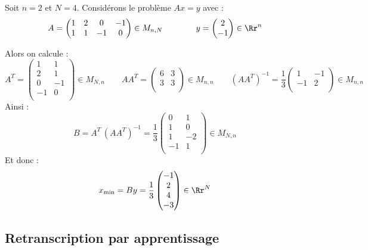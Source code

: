 \documentclass[11pt,class=report,crop=false]{standalone}
\begin{document}

\begin{exemple}
Soit $n=2$ et $N=4$. Considérons le problème $Ax=y$ avec :
$$A = \begin{pmatrix}
1 & 2 & 0 & -1 \\
1 & 1 & -1 & 0 \\
\end{pmatrix} \in M_{n,N}
\qquad\qquad
y = \begin{pmatrix}
2 \\ -1	
\end{pmatrix} \in \Rr^n$$

Alors on calcule :
$$A^T = \begin{pmatrix}
 1 & 1 \\
 2 & 1 \\
 0 & -1 \\
-1 & 0 \\
\end{pmatrix} \in M_{N,n}
\qquad
A A^T =\begin{pmatrix}
6 & 3 \\
3 & 3 \\
\end{pmatrix} \in M_{n,n}
\qquad
(A A^T)^{-1}  = \frac13 \begin{pmatrix}
	1 & -1 \\
	-1 & 2 \\
\end{pmatrix} \in M_{n,n}
$$
Ainsi :
$$
B  = A^T \, (A A^T) ^{-1} = 
\frac13 
\begin{pmatrix}
0 & 1 \\
1 & 0 \\
1 & -2 \\
-1 & 1 \\	
\end{pmatrix} \in M_{N,n}
$$
Et donc :
$$x_{\text{min}} 
= B y = 
\frac13
\begin{pmatrix}
-1 \\ 2 \\ 4 \\ -3	
\end{pmatrix} \in \Rr^N
$$

\end{exemple}

\subsection{Retranscription par apprentissage}
\end{document}
